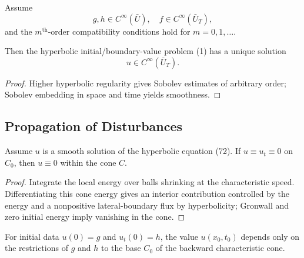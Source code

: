 \begin{theorem}
\label{thm:hyperbolic-infinite-differentiability}

Assume
\[
g, h \in C^\infty(\bar{U}), \quad f \in C^\infty(\bar{U}_T),
\]
and the $m^{\text{th}}$-order compatibility conditions hold for $m = 0, 1, \ldots$.

Then the hyperbolic initial/boundary-value problem (1) has a unique solution
\[
u \in C^\infty(\bar{U}_T).
\]
\end{theorem}

\begin{proof}
\sketch Higher hyperbolic regularity gives Sobolev estimates of arbitrary order; Sobolev embedding in space and time yields smoothness.
\end{proof}

\subsection{Propagation of Disturbances}

\begin{theorem}
\label{thm:hyperbolic-finite-propagation-speed}

Assume $u$ is a smooth solution of the hyperbolic equation (72). If $u \equiv u_t \equiv 0$ on $C_0$, then $u \equiv 0$ within the cone $C$.
\end{theorem}

\begin{proof}
\sketch Integrate the local energy over balls shrinking at the characteristic speed. Differentiating this cone energy gives an interior contribution controlled by the energy and a nonpositive lateral-boundary flux by hyperbolicity; Gronwall and zero initial energy imply vanishing in the cone.
\end{proof}

\begin{remark}
\label{rem:hyperbolic-finite-propagation-remark}

For initial data $u(0)=g$ and $u_t(0)=h$, the value $u(x_0,t_0)$ depends only on the restrictions of $g$ and $h$ to the base $C_0$ of the backward characteristic cone.
\end{remark}


